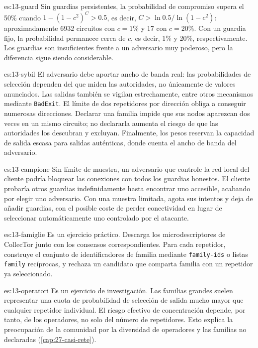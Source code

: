 \begin{soluzione}{es:13-guard}
Sin guardias persistentes, la probabilidad de compromiso supera el 50\% cuando $1-(1-c^2)^C>0.5$, es decir, $C>\ln0.5/\ln(1-c^2)$: aproximadamente \num{6932} circuitos con $c=1\%$ y 17 con $c=20\%$. Con un guardia fijo, la probabilidad permanece cerca de $c$, es decir, 1\% y 20\%, respectivamente. Los guardias son insuficientes frente a un adversario muy poderoso, pero la diferencia sigue siendo considerable.
\end{soluzione}

\begin{soluzione}{es:13-sybil}
El adversario debe aportar ancho de banda real: las probabilidades de selección dependen del que miden las autoridades, no únicamente de valores anunciados. Las salidas también se vigilan estrechamente, entre otros mecanismos mediante \texttt{BadExit}. El límite de dos repetidores por dirección obliga a conseguir numerosas direcciones. Declarar una familia impide que sus nodos aparezcan dos veces en un mismo circuito; no declararla aumenta el riesgo de que las autoridades los descubran y excluyan. Finalmente, los pesos reservan la capacidad de salida escasa para salidas auténticas, donde cuenta el ancho de banda del adversario.
\end{soluzione}

\begin{soluzione}{es:13-campione}
Sin límite de muestra, un adversario que controle la red local del cliente podría bloquear las conexiones con todos los guardias honestos. El cliente probaría otros guardias indefinidamente hasta encontrar uno accesible, acabando por elegir uno adversario. Con una muestra limitada, agota sus intentos y deja de añadir guardias, con el posible coste de perder conectividad en lugar de seleccionar automáticamente uno controlado por el atacante.
\end{soluzione}

\begin{soluzione}{es:13-famiglie}
Es un ejercicio práctico. Descarga los microdescriptores de CollecTor junto con los consensos correspondientes. Para cada repetidor, construye el conjunto de identificadores de familia mediante \texttt{family-ids} o listas \texttt{family} recíprocas, y rechaza un candidato que comparta familia con un repetidor ya seleccionado.
\end{soluzione}

\begin{soluzione}{es:13-operatori}
Es un ejercicio de investigación. Las familias grandes suelen representar una cuota de probabilidad de selección de salida mucho mayor que cualquier repetidor individual. El riesgo efectivo de concentración depende, por tanto, de los operadores, no solo del número de repetidores. Esto explica la preocupación de la comunidad por la diversidad de operadores y las familias no declaradas (\cref{cap:27-casi-rete}).
\end{soluzione}

